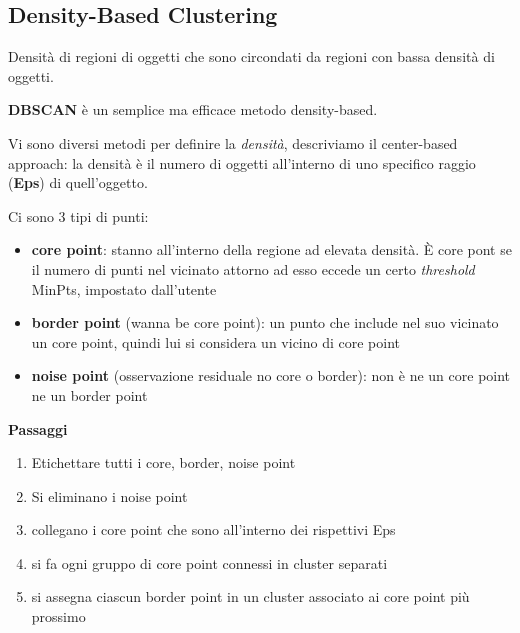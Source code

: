 \subsection{Density-Based Clustering}
Densit\`a di regioni di oggetti che sono circondati da regioni con bassa densit\`a di oggetti.

\textbf{DBSCAN} \`e un semplice ma efficace metodo density-based. 

Vi sono diversi metodi per definire la \textit{densit\`a}, descriviamo il center-based approach: la densit\`a \`e il numero di oggetti all'interno di uno specifico raggio (\textbf{Eps}) di quell'oggetto. 

\noindent
Ci sono 3 tipi di punti:
\begin{itemize}
	\item \textbf{core point}: stanno all'interno della regione ad elevata densit\`a. \`E core pont se il numero di punti nel vicinato attorno ad esso eccede un certo \textit{threshold} MinPts, impostato dall'utente
	\item \textbf{border point} (wanna be core point): un punto che include nel suo vicinato un core point, quindi lui si considera un vicino di core point
	\item \textbf{noise point} (osservazione residuale no core o border): non \`e ne un core point ne un border point
\end{itemize}

\noindent
\textbf{Passaggi}
\begin{enumerate}
	\item Etichettare tutti i core, border, noise point
	\item Si eliminano i noise point
	\item collegano i core point che sono all'interno dei rispettivi Eps
	\item si fa ogni gruppo di core point connessi in cluster separati
	\item si assegna ciascun border point in un cluster associato ai core point pi\`u prossimo
\end{enumerate}

